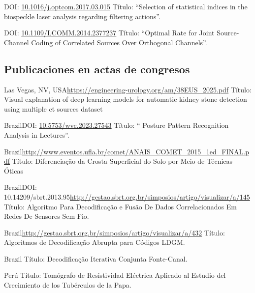 \documentclass[11pt,a4paper,sans]{moderncv} %
\newcommand{\doiurl}[1]{\href{https://doi.org/#1}{#1}}
\begin{document}
	      {DOI: \doiurl{10.1016/j.optcom.2017.03.015}}{}{}
	      {Título: ``Selection of statistical indices in the biospeckle laser analysis regarding filtering actions''.}
	      
	      {DOI: \doiurl{10.1109/LCOMM.2014.2377237}}{}{}
	      {Título: ``Optimal  Rate for Joint Source-Channel Coding of Correlated Sources Over Orthogonal Channels''.}

\subsection{Publicaciones en actas de congresos}

	      {Las Vegas, NV, USA}{}{\url{https://engineering-urology.org/am/38EUS_2025.pdf}}
	      {Título: Visual explanation of deep learning models for automatic
kidney stone detection using multiple ct sources dataset}

	      {Brazil}{}{DOI: \doiurl{10.5753/wvc.2023.27543} }
	      {Título: `` Posture Pattern Recognition Analysis in Lectures''.}
	      

	      {Brazil}{}{\url{http://www.eventos.ufla.br/comet/ANAIS\_COMET\_2015\_1ed\_FINAL.pdf}}
	      {Título: Diferenciação da Crosta Superficial do Solo por Meio de Técnicas Óticas}

	      {Brazil}{DOI: 10.14209/sbrt.2013.95}{\url{http://gestao.sbrt.org.br/simposios/artigo/visualizar/a/145}}
	      {Título: Algoritmo Para Decodificação e Fusão De Dados Correlacionados Em Redes De Sensores Sem Fio.}

	      {Brazil}{}{\url{http://gestao.sbrt.org.br/simposios/artigo/visualizar/a/432}}
	      {Título: Algoritmos de Decodificação Abrupta para Códigos LDGM.}

	      {Brazil}{}{}%
	      {Título: Decodificação Iterativa Conjunta Fonte-Canal.}

	      {Perú}{}{}
	      {Título: Tomógrafo de Resistividad Eléctrica Aplicado al Estudio del Crecimiento de los Tubérculos de la Papa.}
\end{document}
